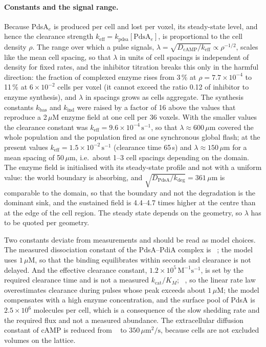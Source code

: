 \paragraph{Constants and the signal range.}
Because PdsA$_e$ is produced per cell and lost per voxel, its steady-state level, and hence the clearance strength $k_\mathrm{eff}=k_\mathrm{pdsa}[\mathrm{PdsA}_e]$, is proportional to the cell density $\rho$.
The range over which a pulse signals, $\lambda=\sqrt{D_\mathrm{cAMP}/k_\mathrm{eff}}\propto\rho^{-1/2}$, scales like the mean cell spacing, so that $\lambda$ in units of cell spacings is independent of density for fixed rates, and the inhibitor titration breaks this only in the harmful direction: the fraction of complexed enzyme rises from 3\,\% at $\rho=7.7\times10^{-4}$ to 11\,\% at $6\times10^{-2}$ cells per voxel (it cannot exceed the ratio 0.12 of inhibitor to enzyme synthesis), and $\lambda$ in spacings grows as cells aggregate.
The synthesis constants $k_\mathrm{bas}$ and $k_\mathrm{ind}$ were raised by a factor of 16 above the values that reproduce a 2\,$\mu$M enzyme field at one cell per 36 voxels.
With the smaller values the clearance constant was $k_\mathrm{eff}=9.6\times10^{-4}\,\mathrm{s^{-1}}$, so that $\lambda\approx600\,\mu$m covered the whole population and the population fired as one synchronous global flash; at the present values $k_\mathrm{eff}=1.5\times10^{-2}\,\mathrm{s^{-1}}$ (clearance time 65\,s) and $\lambda\approx150\,\mu$m for a mean spacing of 50\,$\mu$m, i.e.\ about 1--3 cell spacings depending on the domain.
The enzyme field is initialised with its steady-state profile and not with a uniform value: the world boundary is absorbing, and $\sqrt{D_{\mathrm{PdsA}}/k_\mathrm{deg}}=361\,\mu$m is comparable to the domain, so that the boundary and not the degradation is the dominant sink, and the sustained field is 4.4--4.7 times higher at the centre than at the edge of the cell region.
The steady state depends on the geometry, so $\lambda$ has to be quoted per geometry.

Two constants deviate from measurements and should be read as model choices.
The measured dissociation constant of the PdsA--PdiA complex is ~\cite{franke1981}; the model uses $1\,\mu$M, so that the binding equilibrates within seconds and clearance is not delayed.
And the effective clearance constant, $1.2\times10^{5}\,\mathrm{M^{-1}s^{-1}}$, is set by the required clearance time and is not a measured $k_\mathrm{cat}/K_M$; ~\cite{bader2007}, so the linear rate law overestimates clearance during pulses whose peak exceeds about $1\,\mu$M; the model compensates with a high enzyme concentration, and the surface pool of PdsA is $2.5\times10^{6}$ molecules per cell, which is a consequence of the slow shedding rate and the required flux and not a measured abundance.
The extracellular diffusion constant of cAMP is reduced from ~\cite{dworkin1977} to $350\,\mu\mathrm{m^2/s}$, because cells are not excluded volumes on the lattice.
